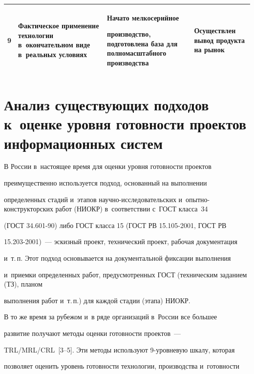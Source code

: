 \begin{table}
\begin{center}
\begin{tabular}{|c|p{40mm}|p{38mm}|p{35mm}|}
\hline

9&Фактическое применение технологии в~окончательном виде в~реальных условиях&Начато мелкосерийное 

производство, под\-го\-тов\-ле\-на база для полномасштабного производства&Осуществлен вывод продукта на рынок\\

\hline

\end{tabular}

\end{center}

\end{table}





\section{Анализ существующих подходов к~оценке уровня готовности проектов информационных систем}



  В России в~настоящее время для оценки уровня готовности проектов 

преимущественно используется подход, основанный на выполнении 

определенных стадий и~этапов научно-исследовательских и~опыт\-но-кон\-ст\-рук\-тор\-ских работ (НИОКР) в~соответствии с~ГОСТ класса~34 

(ГОСТ 34.601-90) либо ГОСТ класса 15 (ГОСТ РВ 15.105-2001, ГОСТ РВ 

15.203-2001)~--- эскизный проект, технический проект, рабочая документация 

и~т.\,п. Этот подход основывается на документальной фиксации выполнения 

и~приемки определенных работ, предусмотренных ГОСТ (техническим заданием (ТЗ), планом 

выполнения работ и~т.\,п.) для каждой стадии (этапа) НИОКР.



  

  В то же время за рубежом и~в ряде организаций в~России все большее 

развитие получают методы оценки готовности проектов~--- 

 TRL\!/\!MRL\!/\!CRL~[3--5]. Эти методы используют 9-уров\-не\-вую шкалу, которая 

позволяет оценить уровень готовности технологии, производства и~готовности 

